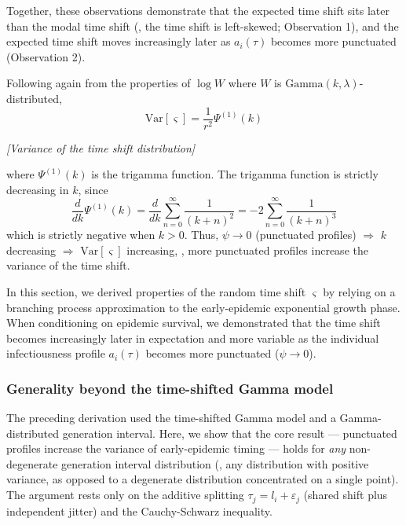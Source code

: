 \noindent Together, these observations demonstrate that the expected time shift sits later than the modal time shift (\ie, the time shift is left-skewed; Observation 1), and the expected time shift moves increasingly later as $a_i(\tau)$ becomes more punctuated (Observation 2). 

 Following again from the properties of $\log W$ where $W$ is $\text{Gamma}(k, \lambda)$-distributed, 
\begin{equation}
	\boxed{\text{Var}[\varsigma] = \frac{1}{r^2} \Psi^{(1)}(k)}
\end{equation}
\begin{center}
	{\it [Variance of the time shift distribution]}
\end{center}
where $\Psi^{(1)}(k)$ is the trigamma function. The trigamma function is strictly decreasing in $k$, since 
\begin{equation}
\frac{d}{dk} \Psi^{(1)}(k) =  \frac{d}{dk }\sum_{n=0}^\infty \frac{1}{(k+n)^2} = 
-2 \sum_{n=0}^\infty \frac{1}{(k + n)^3}
\end{equation}
which is strictly negative when $k > 0$. Thus, $\psi \rightarrow 0$ (punctuated profiles) $\Rightarrow$ $k$ decreasing $\Rightarrow$ $\text{Var}[\varsigma]$ increasing, \ie, more punctuated profiles increase the variance of the time shift. 

 In this section, we derived properties of the random time shift $\varsigma$ by relying on a branching process approximation to the early-epidemic exponential growth phase. When conditioning on epidemic survival, we demonstrated that the time shift becomes increasingly later in expectation and more variable as the individual infectiousness profile $a_i(\tau)$ becomes more punctuated ($\psi \rightarrow 0$).

\clearpage

\subsubsection*{Generality beyond the time-shifted Gamma model}

The preceding derivation used the time-shifted Gamma model and a Gamma-distributed generation interval. Here, we show that the core result --- punctuated profiles increase the variance of early-epidemic timing --- holds for \emph{any} non-degenerate generation interval distribution (\ie, any distribution with positive variance, as opposed to a degenerate distribution concentrated on a single point). The argument rests only on the additive splitting $\tau_j = l_i + \varepsilon_j$ (shared shift plus independent jitter) and the Cauchy-Schwarz inequality.

